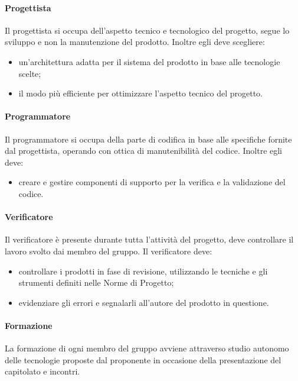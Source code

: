 \paragraph{Progettista}
Il progettista si occupa dell'aspetto tecnico e tecnologico del progetto, segue lo sviluppo e non la manutenzione del prodotto. Inoltre egli deve scegliere: 
\begin{itemize}
\item un'architettura adatta per il sistema del prodotto in base alle tecnologie scelte;
\item il modo più efficiente per ottimizzare l'aspetto tecnico del progetto.
\end{itemize}

\paragraph{Programmatore}
Il programmatore si occupa della parte di codifica in base alle specifiche fornite dal progettista, operando con ottica di manutenibilità del codice. Inoltre egli deve: 
\begin{itemize}
\item creare e gestire componenti di supporto per la verifica e la validazione del codice. 
\end{itemize}

\paragraph{Verificatore}
Il verificatore è presente durante tutta l'attività del progetto, deve controllare il lavoro svolto dai membro del gruppo. Il verificatore deve: 
\begin{itemize}
\item controllare i prodotti in fase di revisione, utilizzando le tecniche e gli strumenti definiti nelle Norme di Progetto; 
\item evidenziare gli errori e segnalarli all'autore del prodotto in questione.
\end{itemize}

\paragraph{Formazione}
La formazione di ogni membro del gruppo avviene attraverso studio autonomo delle tecnologie proposte dal proponente in occasione della presentazione del capitolato e incontri. 

